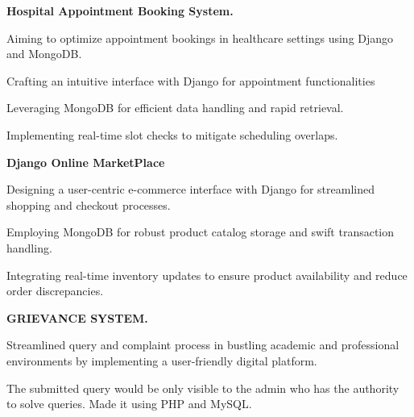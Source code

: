 

\begin{cventries}

  \cvproject
    {\textbf{Hospital Appointment Booking System.}} %
    {}
    {}
    {}
    {
      \begin{cvitems} %
        \item {Aiming to optimize appointment bookings in healthcare settings using Django and MongoDB.
}
        \item {Crafting an intuitive interface with Django for appointment functionalities}
        \item {Leveraging MongoDB for efficient data handling and rapid retrieval.}
               \item {Implementing real-time slot checks to mitigate scheduling overlaps.}
      \end{cvitems}
    }
  \cvproject
    {\textbf{Django Online MarketPlace}} %
    {}
    {}
    {}
    {
      \begin{cvitems} %
        \item {Designing a user-centric e-commerce interface with Django for streamlined shopping and checkout processes.}
        \item {Employing MongoDB for robust product catalog storage and swift transaction handling.}
        \item {Integrating real-time inventory updates to ensure product availability and reduce order discrepancies.}
      \end{cvitems}
    }
  \cvproject
    {\textbf{GRIEVANCE SYSTEM.}} %
    {}
    {}
    {}
    {
      \begin{cvitems} %
        \item {Streamlined query and complaint process in bustling academic and professional environments by implementing a user-friendly digital platform.}
        \item {The submitted query would be only visible to the admin who has the authority to solve queries. Made it using PHP and MySQL.}
      \end{cvitems}
    }



\end{cventries}
